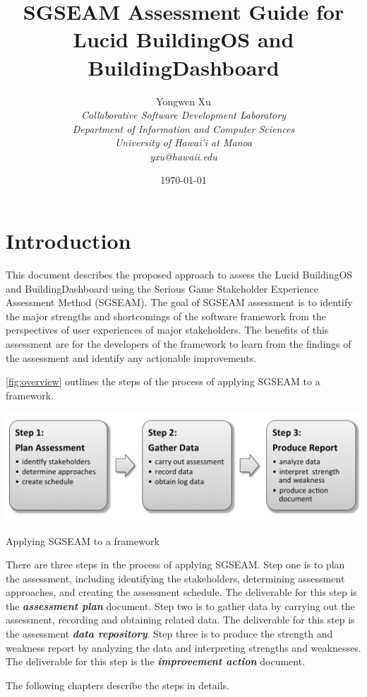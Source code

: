 \documentclass[11pt,oneside]{book}
\title{SGSEAM Assessment Guide for Lucid BuildingOS and BuildingDashboard}
\author{
	 Yongwen Xu \\
\em  Collaborative Software Development Laboratory \\
\em  Department of Information and Computer Sciences \\
\em  University of Hawai'i at Manoa\\
     yxu@hawaii.edu \\
}
\date{\today}
\begin{document}
\maketitle

\newpage

\tableofcontents
\newpage

\chapter{Introduction}
This document describes the proposed approach to assess the Lucid BuildingOS and BuildingDashboard using the Serious Game Stakeholder Experience Assessment Method (SGSEAM). The goal of SGSEAM assessment is to identify the major strengths and shortcomings of the software framework from the perspectives of user experiences of major stakeholders. The benefits of this assessment are for the developers of the framework to learn from the findings of the assessment and identify any actionable improvements.

\autoref{fig:overview} outlines the steps of the process of applying SGSEAM to a framework.

\begin{table}[ht!]
  \center
  \includegraphics[width=0.8\columnwidth]{sgseam-steps}
  \caption{Applying SGSEAM to a framework}
  \label{fig:overview}
\end{table}

There are three steps in the process of applying SGSEAM. Step one is to plan the assessment, including
 identifying the stakeholders, determining assessment approaches, and creating the assessment schedule. 
 The deliverable for this step is the \textbf{\textit{assessment plan}} document. Step two is to gather data by carrying out 
 the assessment, recording and obtaining related data. The deliverable for this step is the 
 assessment \textbf{\textit{data repository}}. Step three is to produce the strength and weakness report by analyzing 
 the data and interpreting strengths and weaknesses. The deliverable for this step is the \textbf{\textit{improvement action}} document.

 The following chapters describe the steps in details.
\end{document}
